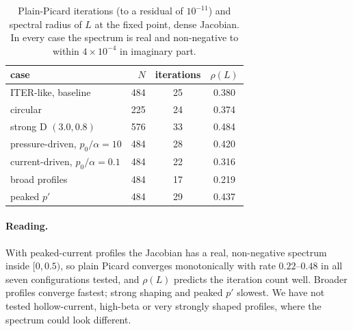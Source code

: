 \documentclass[11pt,a4paper]{article}
\begin{document}
\begin{table}[h]
\centering
\caption{Plain-Picard iterations (to a residual of $10^{-11}$) and spectral radius of $L$ at the fixed point, dense Jacobian. In every case the spectrum is real and non-negative to within $4\times10^{-4}$ in imaginary part.}
\label{tab:spec}
\small
\begin{tabular}{lrcc}
\toprule
case & $N$ & iterations & $\rho(L)$\\
\midrule
ITER-like, baseline              & 484 & 25 & 0.380\\
circular                         & 225 & 24 & 0.374\\
strong D $(3.0,0.8)$             & 576 & 33 & 0.484\\
pressure-driven, $p_0/\alpha=10$ & 484 & 28 & 0.420\\
current-driven, $p_0/\alpha=0.1$ & 484 & 22 & 0.316\\
broad profiles                   & 484 & 17 & 0.219\\
peaked $p'$                      & 484 & 29 & 0.437\\
\bottomrule
\end{tabular}
\end{table}

\paragraph{Reading.} With peaked-current profiles the Jacobian has a real, non-negative spectrum inside $[0,0.5)$, so plain Picard converges monotonically with rate $0.22$--$0.48$ in all seven configurations tested, and $\rho(L)$ predicts the iteration count well. Broader profiles converge fastest; strong shaping and peaked $p'$ slowest. We have not tested hollow-current, high-beta or very strongly shaped profiles, where the spectrum could look different.
\end{document}
